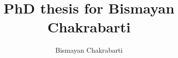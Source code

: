 \documentclass[10pt,a4paper]{article}
\begin{document}
\title{PhD thesis for Bismayan Chakrabarti}

\author{Bismayan Chakrabarti}
\maketitle
\end{document}
